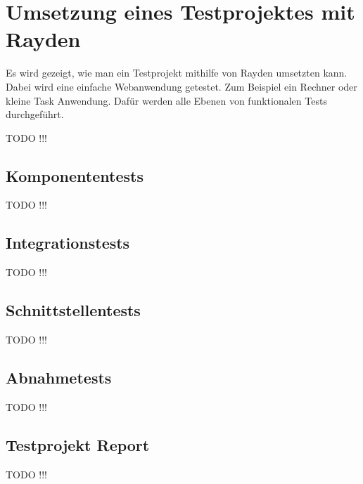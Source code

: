 ﻿\chapter{Umsetzung eines Testprojektes mit Rayden}
\label{cha:Testen}

Es wird gezeigt, wie man ein Testprojekt mithilfe von Rayden umsetzten kann. Dabei wird eine einfache Webanwendung getestet. Zum Beispiel ein Rechner oder kleine Task Anwendung. Dafür werden alle Ebenen von funktionalen Tests durchgeführt.

TODO !!!


\section{Komponententests}

TODO !!!

\section{Integrationstests  }

TODO !!!

\section{Schnittstellentests  }

TODO !!!

\section{Abnahmetests }

TODO !!!

\section{Testprojekt Report }

TODO !!!
